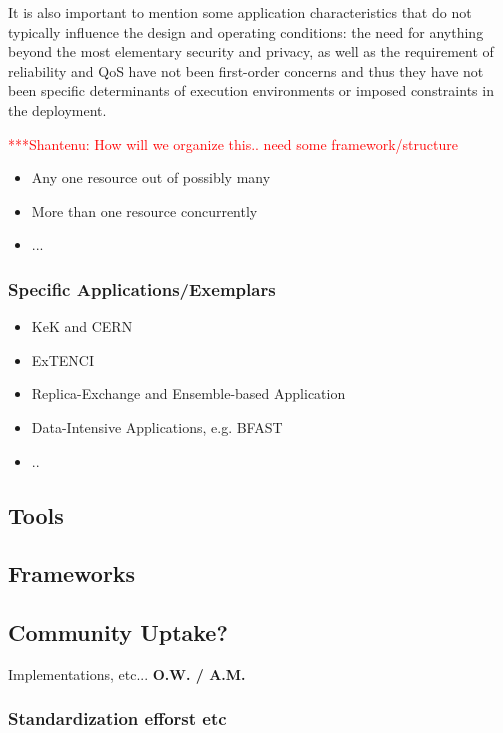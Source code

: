 \documentclass[a4paper,10pt]{article}
\newcommand{\jhanote}[1]{  {\textcolor{red}     { ***Shantenu: #1 }}}
\newcommand{\jhanote}[1]{}
\begin{document}
 It is also important to mention some application characteristics that
 do not typically influence the design and operating conditions: the
 need for anything beyond the most elementary security and privacy, as
 well as the requirement of reliability and QoS have not been
 first-order concerns and thus they have not been specific
 determinants of execution environments or imposed constraints in the
 deployment.

\jhanote{How will we organize this.. need some framework/structure}

\begin{itemize}
\item Any one resource out of possibly many
\item More than one resource concurrently
\item ...
\end{itemize}

\subsubsection{Specific Applications/Exemplars}

\begin{itemize}
\item KeK and CERN
\item ExTENCI
\item Replica-Exchange and Ensemble-based Application
\item Data-Intensive Applications, e.g. BFAST
\item .. 
\end{itemize}


 \subsection{Tools}
 \subsection{Frameworks}

 \subsection{Community Uptake?}

   Implementations, etc... \textbf{O.W. / A.M.}

   \subsubsection{Standardization efforst etc}
\end{document}
